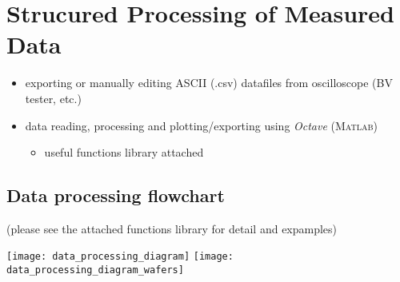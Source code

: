 \section{Strucured Processing of Measured Data}

\begin{itemize}
    \item exporting or manually editing ASCII (.csv) datafiles from oscilloscope (BV tester, etc.)
    \item data reading, processing and plotting/exporting using \textit{Octave} (\textsc{Matlab})
	\begin{itemize}
	    \item {useful functions library attached}
	\end{itemize}
\end{itemize}

\subsection{Data processing flowchart}
(please see the attached functions library for detail and expamples)

\texttt{[image: data\_processing\_diagram]}
\newpage
\texttt{[image: data\_processing\_diagram\_wafers]}
